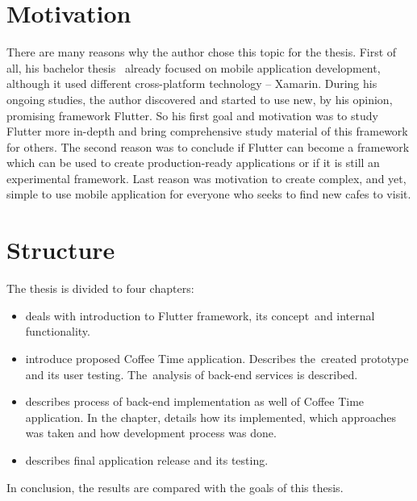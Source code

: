 \begin{introduction}
\section{Motivation}
There are many reasons why the author chose this topic for the thesis. First of all, his bachelor thesis~\cite{nymsap-bp} already focused on mobile application development, although it used different cross-platform technology -- Xamarin. During his ongoing studies, the author discovered and started to use new, by his opinion, promising framework Flutter. So his first goal and motivation was to study Flutter more in-depth and bring comprehensive study material of this framework for others. The second reason was to conclude if Flutter can become a framework which can be used to create production-ready applications or if it is still an experimental framework. Last reason was motivation to create complex, and yet, simple to use mobile application for everyone who seeks to find new cafes to visit.

\section{Structure}
The thesis is divided to four chapters:
\begin{itemize}
\item {} deals with introduction to Flutter framework, its concept~and internal functionality.
\item {} introduce proposed Coffee Time application. Describes the~created prototype and its user testing. The~analysis of back-end services is described. 
\item {} describes process of back-end implementation as well of Coffee Time application. In the chapter, details how its implemented, which approaches was taken and how development process was done. 
\item {} describes final application release and its testing. 
\end{itemize}
In conclusion, the results are compared with the goals of this thesis. 
\end{introduction}